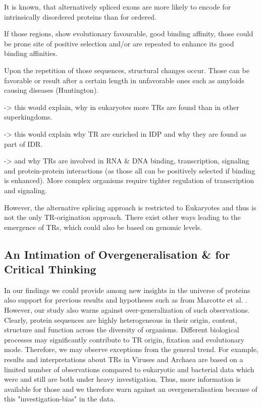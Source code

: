 \documentclass[a4,center,fleqn]{NAR}
\begin{document}
It is known, that alternatively spliced exons are more likely to encode for intrinsically disordered proteins than for ordered. 

If those regions, show evolutionary favourable, good binding affinity, those could be prone site of positive selection and/or are repeated to enhance its good binding affinities. 

Upon the repetition of those sequences, structural changes occur. Those can be favorable or result after a certain length in unfavorable ones such as amyloids causing diseases (Huntington). 

-> this would explain, why in eukaryotes more TRs are found than in other superkingdoms. 

-> this would explain why TR are enriched in IDP and why they are found as part of IDR.

-> and why TRs are involved in RNA \& DNA binding, transcription, signaling and protein-protein interactions (as those all can be positively selected if binding is enhanced). More complex organisms require tighter regulation of transcription and signaling.

However, the alternative splicing approach is restricted to Eukaryotes and thus is not the only TR-origination approach. There exist other ways leading to the emergence of TRs, which could also be based on genomic levels. 

\subsection{An Intimation of Overgeneralisation \& for Critical Thinking}
In our findings we could provide among new insights in the universe of proteins also support for previous results and hypotheses such as from Marcotte et al. \cite{Marcotte1999}.
However, our study also warns against over-generalization of such observations. Clearly, protein sequences are highly heterogeneous in their origin, content, structure and function across the diversity of organisms. Different biological processes may significantly contribute to TR origin, fixation and evolutionary mode. Therefore, we may observe exceptions from the general trend. For example, results and interpretations about TRs in Viruses and Archaea are based on a limited number of observations compared to eukaryotic and bacterial data which were and still are both under heavy investigation. Thus, more information is available for those and we therefore warn against an overgeneralisation because of this "investigation-bias" in the data.
\end{document}
